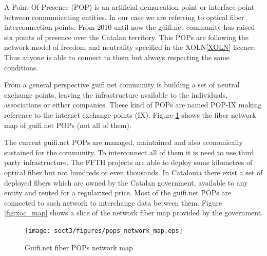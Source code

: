 A Point-Of-Presence (POP) is an artificial demarcation point or interface point between communicating entities.
In our case we are referring to optical fiber interconnection points.
From 2010 until now the guifi.net community has raised six points of presence over the Catalan territory.
This POPs are following the network model of freedom and neutrality specified in the XOLN\ref{XOLN} licence.
Thus anyone is able to connect to them but always respecting the same conditions.

From a general perspective guifi.net community is building a set of neutral exchange points, leaving the
infrastructure available to the individuals, associations or either companies. These kind of POPs are named POP-IX making
reference to the internet exchange points (IX).
\medskip
Figure \ref{fig:fibre_map} shows the fiber network map of guifi.net POPs (not all of them).

\bigskip

The current guifi.net POPs are managed, maintained and also economically sustained for the community. 
To interconnect all of them it is need to use third party infrastructure. The FFTH projects are able to deploy some kilometres
of optical fiber but not hundreds or even thousands.
\newline
In Catalonia there exist a set of deployed fibers which are owned by the Catalan government, available to any entity and 
rented for a regularized price. Most of the guifi.net POPs are connected to such network to interchange data
between them. Figure \ref{fig:xoc_map} shows a slice of the network fiber map provided by the government. 

\begin{figure}[htbp]
  \centering
  \texttt{[image: sect3/figures/pops\_network\_map.eps]} 
  \caption{Guifi.net fiber POPs network map}
  \label{fig:fibre_map}
\end{figure}

